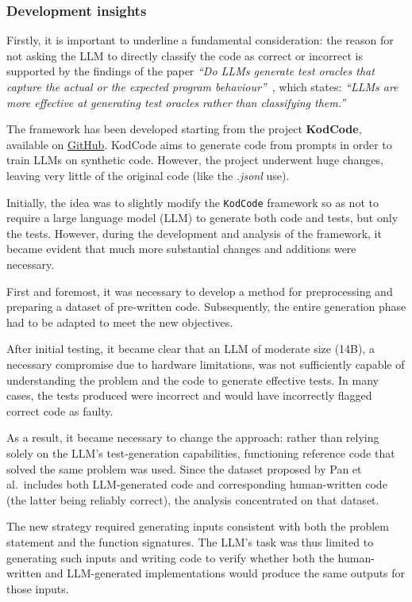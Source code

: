 \subsubsection{Development insights}
Firstly, it is important to underline a fundamental consideration:
the reason for not asking the LLM to directly classify the code as 
correct or incorrect is supported by the findings of the paper 
\textit{``Do LLMs generate test oracles that capture the actual or 
the expected program behaviour''}~\cite{konstantinou2024llms}, which states: 
\textit{``LLMs are more effective at generating test oracles rather than classifying them.''}

The framework has been developed starting from the project \textbf{KodCode}\cite{xu2025kodcode}, 
available on \href{https://github.com/KodCode-AI/kodcode/tree/main}{GitHub}. 
KodCode aims to generate code from prompts in order to train LLMs on 
synthetic code. 
However, the project underwent huge changes, leaving very 
little of the original code (like the \textit{.jsonl} use).


Initially, the idea was to slightly modify the \texttt{KodCode} 
framework so as not to require a large language model (LLM) 
to generate both code and tests, but only the tests. 
However, during the development and analysis of the 
framework, it became evident that much more substantial 
changes and additions were necessary.

First and foremost, it was necessary to develop a 
method for preprocessing and preparing a dataset of 
pre-written code. Subsequently, the entire generation 
phase had to be adapted to meet the new objectives.

After initial testing, it became clear that an LLM 
of moderate size (14B), a necessary compromise due to 
hardware limitations, was not sufficiently capable of 
understanding the problem and the code to generate 
effective tests. In many cases, the tests produced 
were incorrect and would have incorrectly flagged 
correct code as faulty.

As a result, it became necessary to change the approach: 
rather than relying solely on the LLM’s test-generation 
capabilities, functioning reference code that solved the 
same problem was used. Since the dataset proposed by 
Pan et al.\ includes both LLM-generated code and 
corresponding human-written code (the latter being reliably correct), 
the analysis concentrated on that dataset.

The new strategy required generating inputs consistent 
with both the problem statement and the function signatures. 
The LLM's task was thus limited to generating such inputs 
and writing code to verify whether both the human-written 
and LLM-generated implementations would produce the same 
outputs for those inputs.

